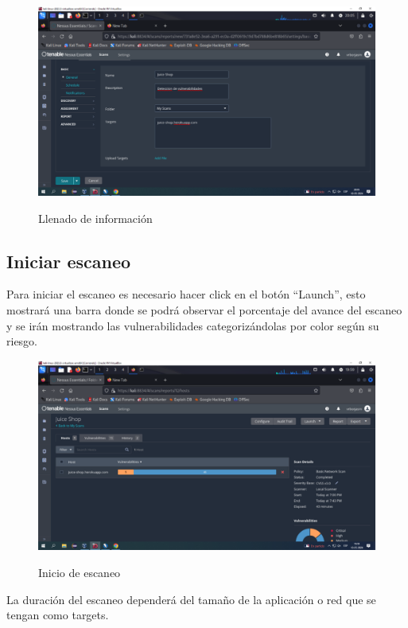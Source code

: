 \documentclass[stu, 11pt, letterpaper, donotrepeattitle, floatsintext, natbib]{apa7}
\begin{document}
\begin{figure}[H]
    \centering
    \caption{Llenado de información}
    \includegraphics[width=0.75\linewidth]{Imagen6.png} %
    \label{fig:OverallEffect}
\end{figure}

\subsection{Iniciar escaneo} 
Para iniciar el escaneo es necesario hacer click en el botón “Launch”, esto mostrará una barra donde se podrá observar el porcentaje del avance del escaneo y se irán mostrando las vulnerabilidades categorizándolas por color según su riesgo.

\begin{figure}[H]
    \centering
    \caption{Inicio de escaneo}
    \includegraphics[width=0.75\linewidth]{Imagen7.png} %
    \label{fig:OverallEffect}
\end{figure}

La duración del escaneo dependerá del tamaño de la aplicación o red que se tengan como targets.
\end{document}
